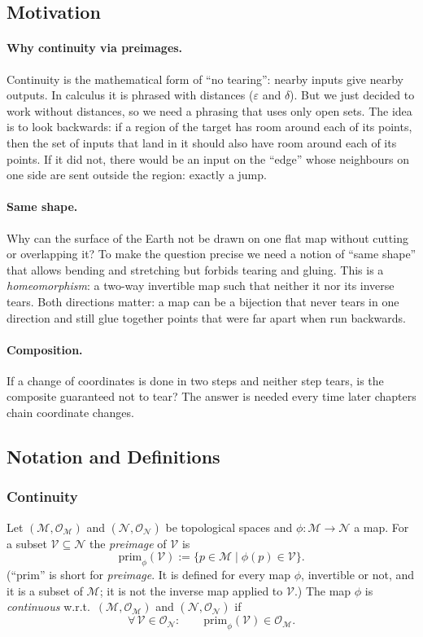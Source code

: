 \documentclass[11pt]{article}
\newcommand{\prim}[1]{\mathrm{prim}_{#1}}
\begin{document}
\subsection*{Motivation}

\paragraph{Why continuity via preimages.}
Continuity is the mathematical form of ``no tearing'': nearby inputs give nearby outputs. In calculus it is phrased with distances ($\varepsilon$ and $\delta$). But we just decided to work without distances, so we need a phrasing that uses only open sets. The idea is to look backwards: if a region of the target has room around each of its points, then the set of inputs that land in it should also have room around each of its points. If it did not, there would be an input on the ``edge'' whose neighbours on one side are sent outside the region: exactly a jump.

\paragraph{Same shape.}
Why can the surface of the Earth not be drawn on one flat map without cutting or overlapping it? To make the question precise we need a notion of ``same shape'' that allows bending and stretching but forbids tearing and gluing. This is a \emph{homeomorphism}: a two-way invertible map such that neither it nor its inverse tears. Both directions matter: a map can be a bijection that never tears in one direction and still glue together points that were far apart when run backwards.

\paragraph{Composition.}
If a change of coordinates is done in two steps and neither step tears, is the composite guaranteed not to tear? The answer is needed every time later chapters chain coordinate changes.

\subsection*{Notation and Definitions}

\subsubsection*{Continuity}
Let $(\mathcal M,\mathcal O_{\mathcal M})$ and $(\mathcal N,\mathcal O_{\mathcal N})$ be topological spaces and $\phi:\mathcal M\to\mathcal N$ a map. For a subset $\mathcal V\subseteq\mathcal N$ the \emph{preimage} of $\mathcal V$ is
\[
\prim{\phi}(\mathcal V):=\{p\in\mathcal M\mid\phi(p)\in\mathcal V\}.
\]
(``$\mathrm{prim}$'' is short for \emph{preimage}. It is defined for every map $\phi$, invertible or not, and it is a subset of $\mathcal M$; it is not the inverse map applied to $\mathcal V$.) The map $\phi$ is \emph{continuous} w.r.t.\ $(\mathcal M,\mathcal O_{\mathcal M})$ and $(\mathcal N,\mathcal O_{\mathcal N})$ if
\[
\forall\,\mathcal V\in\mathcal O_{\mathcal N}:\qquad \prim{\phi}(\mathcal V)\in\mathcal O_{\mathcal M}.
\]
\end{document}
